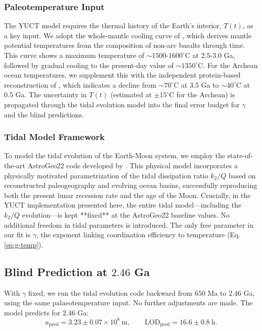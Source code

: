 \documentclass[12pt]{article}
\theoremstyle{remark}
\begin{document}
	\subsubsection{Paleotemperature Input}
	The YUCT model requires the thermal history of the Earth's interior, \(T(t)\), as a key input. We adopt the whole-mantle cooling curve of \cite{Herzberg2010}, which derives mantle potential temperatures from the composition of non-arc basalts through time. This curve shows a maximum temperature of \(\sim 1500\)-\(1600^\circ\)C at 2.5-3.0 Ga, followed by gradual cooling to the present-day value of \(\sim 1350^\circ\)C. For the Archean ocean temperatures, we supplement this with the independent protein-based reconstruction of \cite{Gaucher2008}, which indicates a decline from \(\sim 70^\circ\)C at 3.5 Ga to \(\sim 40^\circ\)C at 0.5 Ga. The uncertainty in \(T(t)\) (estimated at \(\pm 15^\circ\)C for the Archean) is propagated through the tidal evolution model into the final error budget for \(\gamma\) and the blind predictions.
	
	\subsubsection{Tidal Model Framework}
	To model the tidal evolution of the Earth-Moon system, we employ the state-of-the-art AstroGeo22 code developed by \cite{Farhat2022}. This physical model incorporates a physically motivated parametrization of the tidal dissipation ratio \(k_2/Q\) based on reconstructed paleogeography and evolving ocean basins, successfully reproducing both the present lunar recession rate and the age of the Moon. Crucially, in the YUCT implementation presented here, the entire tidal model—including the \(k_2/Q\) evolution—is kept **fixed** at the AstroGeo22 baseline values. No additional freedom in tidal parameters is introduced. The only free parameter in our fit is \(\gamma\), the exponent linking coordination efficiency to temperature (Eq. \ref{eq:g-temp}).
	
	\subsection{Blind Prediction at $2.46$ Ga}
	
	With $\gamma$ fixed, we run the tidal evolution code backward from $650$ Ma to $2.46$ Ga, using the same palaeotemperature input. No further adjustments are made. The model predicts for $2.46$ Ga:
	\[
	a_{\mathrm{pred}} = 3.23 \pm 0.07 \times 10^8\ \mathrm{m},\qquad
	\mathrm{LOD}_{\mathrm{pred}} = 16.6 \pm 0.8\ \mathrm{h}.
	\]
	
\end{document}
